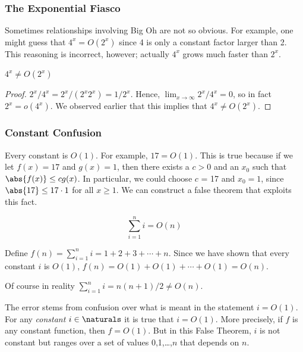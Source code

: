 \subsubsection{The Exponential Fiasco}

Sometimes relationships involving Big Oh are not so obvious.  For
example, one might guess that $4^x = O(2^x)$ since 4 is only a
constant factor larger than 2.  This reasoning is incorrect,
however; actually $4^x$ grows much faster than $2^x$.

\begin{proposition}
$4^x \neq O(2^x)$
\end{proposition}

\begin{proof}
$2^x/4^x = 2^x/(2^x2^x) = 1/2^x$.  Hence, $\lim_{x \rightarrow \infty}
2^x/4^x = 0$, so in fact $2^x = o(4^x)$.  We observed earlier that this
implies that $4^x \neq O(2^x)$.
\end{proof}

\subsubsection{Constant Confusion}

Every constant is $O(1)$.  For example, $17 = O(1)$.  This is true because
if we let $f(x) = 17$ and $g(x) = 1$, then there exists a $c > 0$ and an
$x_0$ such that $\abs{f(x)} \leq c g(x)$.  In particular, we could choose
$c$ = 17 and $x_0 = 1$, since $\abs{17} \leq 17 \cdot 1$ for all $x \geq
1$.  We can construct a false theorem that exploits this fact.

\begin{falsethm}
\[
\sum_{i=1}^n i = O(n)
\]
\end{falsethm}

\begin{falseproof}
Define $f(n) = \sum_{i=1}^n i = 1 + 2 + 3 + \cdots + n$.  Since we
have shown that every constant $i$ is $O(1)$, $f(n) = O(1) + O(1) +
\cdots + O(1) = O(n)$.
\end{falseproof}

Of course in reality $\sum_{i=1}^n i = n(n+1)/2 \neq O(n)$.

The error stems from confusion over what is meant in the statement $i =
O(1)$.  For any \emph{constant} $i\in \naturals$ it is true that $i =
O(1)$.  More precisely, if $f$ is any constant function, then $f = O(1)$.
But in this False Theorem, $i$ is not constant but ranges over a set of
values 0,1,\dots,$n$ that depends on $n$.

